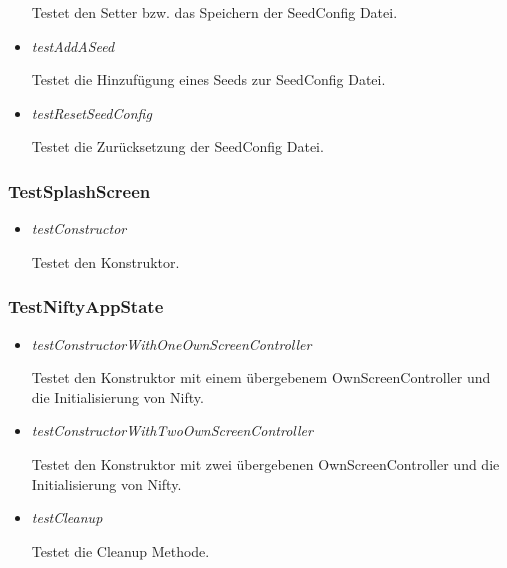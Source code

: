 \begin{itemize}
        \begin{leftbar}[0.9\linewidth]
            Testet den Setter bzw. das Speichern der SeedConfig Datei.
        \end{leftbar}
    \item \textit{testAddASeed}
        \begin{leftbar}[0.9\linewidth]
            Testet die Hinzufügung eines Seeds zur SeedConfig Datei.
        \end{leftbar}
    \item \textit{testResetSeedConfig}
        \begin{leftbar}[0.9\linewidth]
            Testet die Zurücksetzung der SeedConfig Datei.
        \end{leftbar}
\end{itemize}

\subsubsection{TestSplashScreen}
\begin{itemize}
    \item \textit{testConstructor}
        \begin{leftbar}[0.9\linewidth]
            Testet den Konstruktor.
        \end{leftbar}
\end{itemize}

\pagebreak
\subsubsection{TestNiftyAppState}
\begin{itemize}
    \item \textit{testConstructorWithOneOwnScreenController}
        \begin{leftbar}[0.9\linewidth]
            Testet den Konstruktor mit einem übergebenem OwnScreenController und die
            Initialisierung von Nifty.
        \end{leftbar}
    \item \textit{testConstructorWithTwoOwnScreenController}
        \begin{leftbar}[0.9\linewidth]
            Testet den Konstruktor mit zwei übergebenen OwnScreenController und die
            Initialisierung von Nifty.
        \end{leftbar}
    \item \textit{testCleanup}
        \begin{leftbar}[0.9\linewidth]
            Testet die Cleanup Methode.
        \end{leftbar}
\end{itemize}


